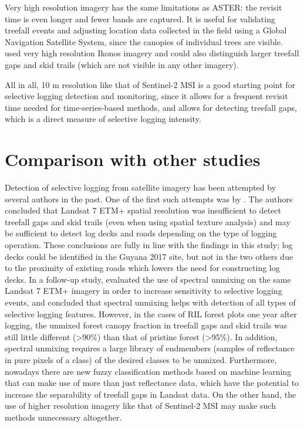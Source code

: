 \documentclass[a4paper,12pt]{scrbook}
\begin{document}
Very high resolution imagery has the same limitations as \ac{ASTER}: the revisit time is even longer and fewer bands are captured. It is useful for validating treefall events and adjusting location data collected in the field using a Global Navigation Satellite System, since the canopies of individual trees are visible. \citet{read_spatial_2003} used very high resolution Ikonos imagery and could also distinguish larger treefall gaps and skid trails (which are not visible in any other imagery).

All in all, 10 m resolution like that of Sentinel-2 \ac{MSI} is a good starting point for selective logging detection and monitoring, since it allows for a frequent revisit time needed for time-series-based methods, and allows for detecting treefall gaps, which is a direct measure of selective logging intensity.

\section{Comparison with other studies}

Detection of selective logging from satellite imagery has been attempted by several authors in the past. One of the first such attempts was by \citet{asner_remote_2002}. The authors concluded that Landsat 7 \ac{ETM+} spatial resolution was insufficient to detect treefall gaps and skid trails (even when using spatial texture analysis) and may be sufficient to detect log decks and roads depending on the type of logging operation. These conclusions are fully in line with the findings in this study; log decks could be identified in the Guyana 2017 site, but not in the two others due to the proximity of existing roads which lowers the need for constructing log decks. In a follow-up study, \citet{asner_canopy_2004} evaluated the use of spectral unmixing on the same Landsat 7 \ac{ETM+} imagery in order to increase sensitivity to selective logging events, and concluded that spectral unmixing helps with detection of all types of selective logging features. However, in the cases of \ac{RIL} forest plots one year after logging, the unmixed forest canopy fraction in treefall gaps and skid trails was still little different (>90\%) than that of pristine forest (>95\%). In addition, spectral unmixing requires a large library of endmembers (samples of reflectance in pure pixels of a class) of the desired classes to be unmixed. Furthermore, nowadays there are new fuzzy classification methods based on machine learning that can make use of more than just reflectance data, which have the potential to increase the separability of treefall gaps in Landsat data. On the other hand, the use of higher resolution imagery like that of Sentinel-2 \ac{MSI} may make such methods unnecessary altogether.
\end{document}
